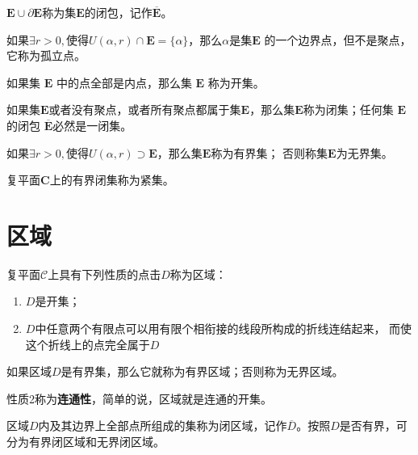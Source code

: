 \documentclass[lang=cn,10pt]{elegantbook}
\begin{document}
\begin{definition}[闭包]
	$\mathbf{E}\cup\partial \mathbf{E}$称为集$\mathbf{E}$的闭包，记作$\mathbf{\overline E}$。
\end{definition}

\begin{definition}[孤立点]
	如果$\exists r >0,$使得$U(\alpha,r) \cap \mathbf{E} = \{\alpha\}$，那么$\alpha$是集$\mathbf{E}$
	的一个边界点，但不是聚点，它称为孤立点。
\end{definition}

\begin{definition}[开集]
	如果集 $\mathbf{E}$ 中的点全部是内点，那么集 $\mathbf{E}$ 称为开集。
\end{definition}

\begin{definition}[闭集]
	如果集$\mathbf{E}$或者没有聚点，或者所有聚点都属于集$\mathbf{E}$，那么集$\mathbf{E}$称为闭集；任何集 $\mathbf{E}$ 的闭包 $\overline{\mathbf{E}}$必然是一闭集。
\end{definition}

\begin{definition}[有界集与无界集]
	如果$\exists r >0,$使得$U(\alpha,r) \supset \mathbf{E}$，那么集$\mathbf{E}$称为有界集；
	否则称集$\mathbf{E}$为无界集。
\end{definition}

\begin{definition}[紧集]
	复平面$\mathbf{C}$上的有界闭集称为紧集。
\end{definition}

\section{区域}
\begin{definition}[区域]
	复平面$\mathcal{C}$上具有下列性质的点击$D$称为区域：
	\begin{enumerate}
		\item $D$是开集；
		\item $D$中任意两个有限点可以用有限个相衔接的线段所构成的折线连结起来，
		      而使这个折线上的点完全属于$D$
	\end{enumerate}
	如果区域$D$是有界集，那么它就称为有界区域；否则称为无界区域。
\end{definition}

性质2称为\textbf{连通性}，简单的说，区域就是连通的开集。

\begin{definition}[闭区域]
	区域$D$内及其边界上全部点所组成的集称为闭区域，记作$\overline{D}$。按照$D$是否有界，可
	分为有界闭区域和无界闭区域。
\end{definition}
\end{document}
